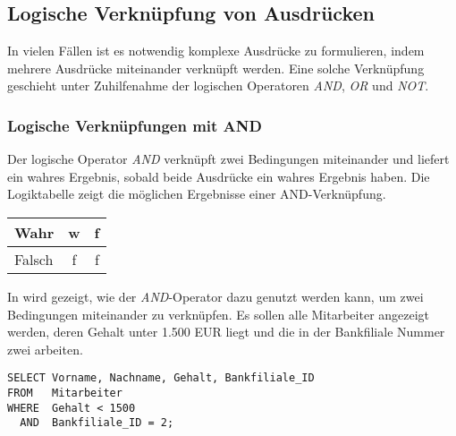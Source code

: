 \subsection{Logische Verknüpfung von Ausdrücken}
In vielen Fällen ist es notwendig komplexe Ausdrücke zu formulieren, indem mehrere Ausdrücke miteinander verknüpft werden. Eine solche Verknüpfung geschieht unter Zuhilfenahme der logischen Operatoren \textit{AND}, \textit{OR} und \textit{NOT}.
\subsubsection{Logische Verknüpfungen mit AND}
Der logische Operator \textit{AND} verknüpft zwei Bedingungen miteinander und liefert ein wahres Ergebnis, sobald beide Ausdrücke ein wahres Ergebnis haben. Die Logiktabelle  zeigt die möglichen Ergebnisse einer AND-Verknüpfung.
\vspace{\baselineskip}
\begin{center}
    \label{logikand}
    \tablehead{}
    \tabletail{
        \hline
    }
    \tablelasttail{
        \hline
    }
    \begin{supertabular}{|l|c|c|}
        Wahr & w & f \\
        \hline
        Falsch & f & f \\
    \end{supertabular}
\end{center}
In  wird gezeigt, wie der \textit{AND}-Operator dazu genutzt werden kann, um zwei Bedingungen miteinander zu verknüpfen. Es sollen alle Mitarbeiter angezeigt werden, deren Gehalt unter 1.500 EUR liegt und die in der Bankfiliale Nummer zwei arbeiten.
\begin{lstlisting}[language=oracle_sql,caption={Der AND Operator},label=sql02_11]
SELECT Vorname, Nachname, Gehalt, Bankfiliale_ID
FROM   Mitarbeiter
WHERE  Gehalt < 1500
  AND  Bankfiliale_ID = 2;
          \end{lstlisting}
